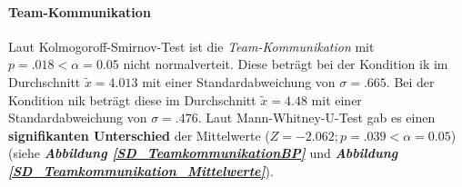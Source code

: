 \documentclass[a4paper,11pt]{article}%
\renewcommand{\\}{\vspace*{0.5\baselineskip} \newline}
\begin{document}
\paragraph{Team-Kommunikation} 
Laut Kolmogoroff-Smirnov-Test ist die \textit{Team-Kommunikation} mit $p = .018 < \alpha = 0.05$ nicht normalverteit. 
Diese beträgt bei der Kondition \ac{ik} im Durchschnitt $\tilde x = 4.013$ mit einer Standardabweichung von $\sigma = .665$.
Bei der Kondition \ac{nik} beträgt diese im Durchschnitt $\tilde x = 4.48$ mit einer Standardabweichung von $\sigma = .476$. 
Laut Mann-Whitney-U-Test gab es einen \textbf{signifikanten Unterschied} der Mittelwerte ($ Z = -2.062; p = .039 < \alpha = 0.05$) (siehe \textbf{\textit{Abbildung \ref{SD_TeamkommunikationBP}}} und \textbf{\textit{Abbildung \ref{SD_Teamkommunikation_Mittelwerte}}}).
\end{document}
